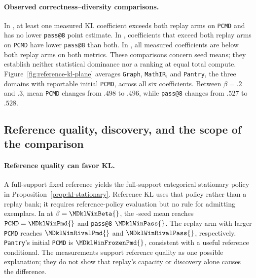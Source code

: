 \documentclass{article}
\newcommand{\1}{\mathbf 1}
\newcommand{\pmd}{\texttt{PCMD}}
\theoremstyle{remark}
\theoremstyle{definition}
\theoremstyle{plain}
\begin{document}
\paragraph{Observed correctness--diversity comparisons.}
In \MDklFreeNames{}, at least one measured KL coefficient exceeds both
replay arms on \pmd{} and has no lower \texttt{pass@8} point estimate.
In \MDklPricedNames{}, coefficients that exceed both replay arms on
\pmd{} have lower \texttt{pass@8} than both. In \MDklMemoryNames{},
all measured coefficients are below both replay arms on both metrics.
These comparisons concern seed means; they establish neither statistical
dominance nor a ranking at equal total compute.
Figure~\ref{fig:reference-kl-plane} averages \texttt{Graph}, \texttt{MathIR}, and
\texttt{Pantry}, the three domains with reportable initial \pmd{}, across all
six coefficients. Between $\beta=.2$ and $.3$, mean \pmd{} changes from
$.498$ to $.496$, while \texttt{pass@8} changes from $.527$ to $.528$.

\subsection{Reference quality, discovery, and the scope of the comparison}
\label{app:theory-kl-case}

\paragraph{Reference quality can favor KL.}
A full-support fixed reference yields the full-support categorical
stationary policy in Proposition~\ref{prop:kl-stationary}. Reference KL
uses that policy rather than a replay bank; it requires reference-policy
evaluation but no rule for admitting exemplars. In \MDklWinDomain{} at
$\beta=\MDklWinBeta{}$, the \MDklWinSeeds{}-seed mean reaches
$\pmd{}=\MDklWinPmd{}$ and \texttt{pass@8} $\MDklWinPass{}$.
The replay arm with larger \pmd{} reaches $\MDklWinRivalPmd{}$ and
$\MDklWinRivalPass{}$, respectively. \texttt{Pantry}'s initial \pmd{} is
$\MDklWinFrozenPmd{}$, consistent with a useful reference conditional.
The measurements support reference quality as one possible explanation;
they do not show that replay's capacity or discovery alone causes the
difference.
\end{document}
